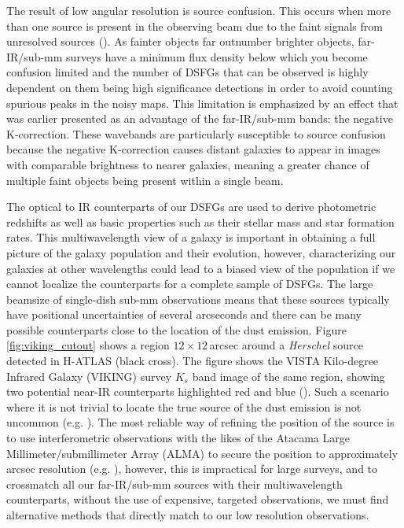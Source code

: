 The result of low angular resolution is source confusion. This occurs when more than one source is present in the observing beam due to the faint signals from unresolved sources (\citealt{Condon_1974}). As fainter objects far outnumber brighter objects, far-IR/sub-mm surveys have a minimum flux density below which you become confusion limited and the number of DSFGs that can be observed is highly dependent on them being high significance detections in order to avoid counting spurious peaks in the noisy maps. This limitation is emphasized by an effect that was earlier presented as an advantage of the far-IR/sub-mm bands: the negative K-correction. These wavebands are particularly susceptible to source confusion because the negative K-correction causes distant galaxies to appear in images with comparable brightness to nearer galaxies, meaning a greater chance of multiple faint objects being present within a single beam.

The optical to IR counterparts of our DSFGs are used to derive photometric redshifts as well as basic properties such as their stellar mass and star formation rates. This multiwavelength view of a galaxy is important in obtaining a full picture of the galaxy population and their evolution, however, characterizing our galaxies at other wavelengths could lead to a biased view of the population if we cannot localize the counterparts for a complete sample of DSFGs. The large beamsize of single-dish sub-mm observations means that these sources typically have positional uncertainties of several arcseconds and there can be many possible counterparts close to the location of the dust emission. Figure \ref{fig:viking_cutout} shows a region $12\times12\,$arcsec around a \textit{Herschel} source detected in H-ATLAS (black cross). The figure shows the VISTA Kilo-degree Infrared Galaxy (VIKING) survey $K_s$ band image of the same region, showing two potential near-IR counterparts highlighted red and blue (\citealt{Fleuren_2012}). Such a scenario where it is not trivial to locate the true source of the dust emission is not uncommon (e.g. \citealt{Ivison_2002, Pope_2006, Chapin_2011, Smith_2011, Kim_2012, Alberts_2013, Bourne_2016, Furlanetto_2018}). The most reliable way of refining the position of the source is to use interferometric observations with the likes of the Atacama Large Millimeter/submillimeter Array (ALMA) to secure the position to approximately arcsec resolution (e.g. \citealt{Karim_2013, Hodge_2013, Miettinen_2015,Simpson_2015, Fujimoto_2016}), however, this is impractical for large surveys, and to crossmatch all our far-IR/sub-mm sources with their multiwavelength counterparts, without the use of expensive, targeted observations, we must find alternative methods that directly match to our low resolution observations.

